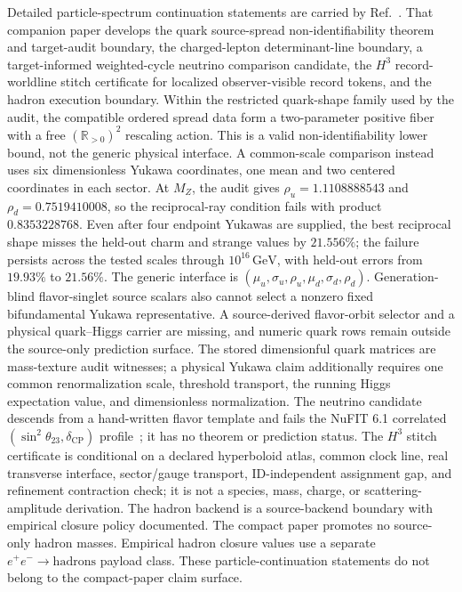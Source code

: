 \documentclass[11pt]{article}
\begin{document}
Detailed particle-spectrum continuation statements are carried by Ref.~\cite{ophparticles}. That companion paper develops the quark source-spread non-identifiability theorem and target-audit boundary, the charged-lepton determinant-line boundary, a target-informed weighted-cycle neutrino comparison candidate, the \(H^3\) record-worldline stitch certificate for localized observer-visible record tokens, and the hadron execution boundary. Within the restricted quark-shape family used by the audit, the compatible ordered spread data form a two-parameter positive fiber with a free \((\mathbb R_{>0})^2\) rescaling action. This is a valid non-identifiability lower bound, not the generic physical interface. A common-scale comparison instead uses six dimensionless Yukawa coordinates, one mean and two centered coordinates in each sector. At \(M_Z\), the audit gives \(\rho_u=1.1108888543\) and \(\rho_d=0.7519410008\), so the reciprocal-ray condition fails with product \(0.8353228768\). Even after four endpoint Yukawas are supplied, the best reciprocal shape misses the held-out charm and strange values by \(21.556\%\); the failure persists across the tested scales through \(10^{16}\,\mathrm{GeV}\), with held-out errors from \(19.93\%\) to \(21.56\%\). The generic interface is \((\mu_u,\sigma_u,\rho_u,\mu_d,\sigma_d,\rho_d)\). Generation-blind flavor-singlet source scalars also cannot select a nonzero fixed bifundamental Yukawa representative. A source-derived flavor-orbit selector and a physical quark--Higgs carrier are missing, and numeric quark rows remain outside the source-only prediction surface. The stored dimensionful quark matrices are mass-texture audit witnesses; a physical Yukawa claim additionally requires one common renormalization scale, threshold transport, the running Higgs expectation value, and dimensionless normalization. The neutrino candidate descends from a hand-written flavor template and fails the NuFIT 6.1 correlated \((\sin^2\theta_{23},\delta_{\mathrm{CP}})\) profile~\cite{nufit61}; it has no theorem or prediction status. The \(H^3\) stitch certificate is conditional on a declared hyperboloid atlas, common clock line, real transverse interface, sector/gauge transport, ID-independent assignment gap, and refinement contraction check; it is not a species, mass, charge, or scattering-amplitude derivation. The hadron backend is a source-backend boundary with empirical closure policy documented. The compact paper promotes no source-only hadron masses. Empirical hadron closure values use a separate \(e^+e^-\to\mathrm{hadrons}\) payload class. These particle-continuation statements do not belong to the compact-paper claim surface.
\end{document}
